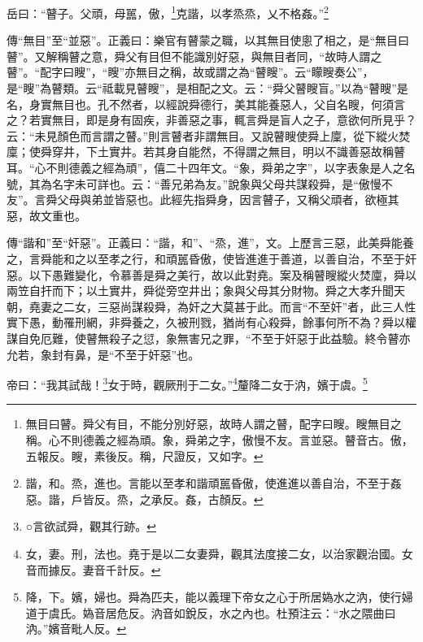 岳曰：“瞽子。父頑，母嚚，傲，\footnote{無目曰瞽。舜父有目，不能分別好惡，故時人謂之瞽，配字曰瞍。瞍無目之稱。心不則德義之經為頑。象，舜弟之字，傲慢不友。言並惡。瞽音古。傲，五報反。瞍，素後反。稱，尺證反，又如字。}克諧，以孝烝烝，乂不格姦。”\footnote{諧，和。烝，進也。言能以至孝和諧頑嚚昏傲，使進進以善自治，不至于姦惡。諧，戶皆反。烝，之承反。姦，古顏反。}

{\noindent\zhuan{}\fzbyks 傳“無目”至“並惡”。正義曰：樂官有瞽蒙之職，以其無目使悤了相之，是“無目曰瞽”。又解稱瞽之意，舜父有目但不能識別好惡，與無目者同，“故時人謂之瞽”。“配字曰瞍”，“瞍”亦無目之稱，故或謂之為“瞽瞍”。云“矇瞍奏公”，是“瞍”為瞽類。云“祗載見瞽瞍”，是相配之文。云：“舜父瞽瞍盲。”以為“瞽瞍”是名，身實無目也。孔不然者，以經說舜德行，美其能養惡人，父自名瞍，何須言之？若實無目，即是身有固疾，非善惡之事，輒言舜是盲人之子，意欲何所見乎？云：“未見顏色而言謂之瞽。”則言瞽者非謂無目。又說瞽瞍使舜上廩，從下縱火焚廩；使舜穿井，下土實井。若其身自能然，不得謂之無目，明以不識善惡故稱瞽耳。“心不則德義之經為頑”，僖二十四年文。“象，舜弟之字”，以字表象是人之名號，其為名字未可詳也。云：“善兄弟為友。”說象與父母共謀殺舜，是“傲慢不友”。言舜父母與弟並皆惡也。此經先指舜身，因言瞽子，又稱父頑者，欲極其惡，故文重也。 \par}

{\noindent\zhuan{}\fzbyks 傳“諧和”至“奸惡”。正義曰：“諧，和”、“烝，進”，文。上歷言三惡，此美舜能養之，言舜能和之以至孝之行，和頑嚚昏傲，使皆進進于善道，以善自治，不至于奸惡。以下愚難變化，令慕善是舜之美行，故以此對堯。案及稱瞽瞍縱火焚廩，舜以兩笠自扞而下；以土實井，舜從旁空井出；象與父母其分財物。舜之大孝升聞天朝，堯妻之二女，三惡尚謀殺舜，為奸之大莫甚于此。而言“不至奸”者，此三人性實下愚，動罹刑網，非舜養之，久被刑戮，猶尚有心殺舜，餘事何所不為？舜以權謀自免厄難，使瞽無殺子之愆，象無害兄之罪，“不至于奸惡于此益驗。終令瞽亦允若，象封有鼻，是“不至于奸惡”也。 \par}

帝曰：“我其試哉！\footnote{○言欲試舜，觀其行跡。}女于時，觀厥刑于二女。”\footnote{女，妻。刑，法也。堯于是以二女妻舜，觀其法度接二女，以治家觀治國。女音而據反。妻音千計反。}釐降二女于汭，嬪于虞。\footnote{降，下。嬪，婦也。舜為匹夫，能以義理下帝女之心于所居媯水之汭，使行婦道于虞氏。媯音居危反。汭音如銳反，水之內也。杜預注云：“水之隈曲曰汭。”嬪音毗人反。}


